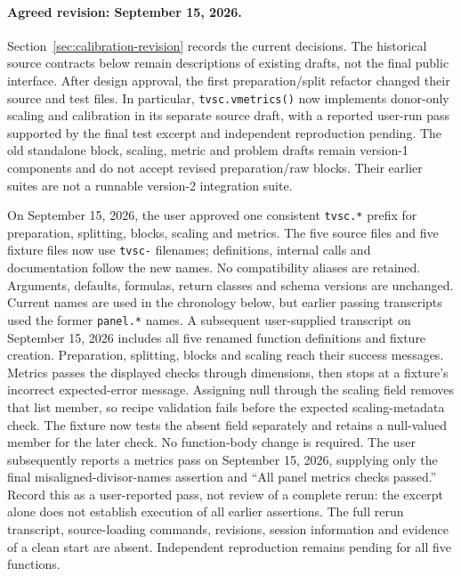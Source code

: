 \documentclass[11pt]{article}
\begin{document}
\paragraph{Agreed revision: September 15, 2026.}
Section~\ref{sec:calibration-revision} records the current decisions.
The historical source contracts below remain descriptions of existing
drafts, not the final public interface. After design approval, the first
preparation/split refactor changed their source and test files. In
particular, \texttt{tvsc.vmetrics()} now implements donor-only scaling and
calibration in its separate source draft, with a reported user-run pass
supported by the final test excerpt and independent reproduction pending.
The old standalone block, scaling, metric and problem drafts remain
version-1 components and do not accept revised preparation/raw blocks.
Their earlier suites are not a runnable version-2 integration suite.

On September 15, 2026, the user approved one consistent \texttt{tvsc.*}
prefix for preparation, splitting, blocks, scaling and metrics. The five
source files and five fixture files now use \texttt{tvsc-} filenames;
definitions, internal calls and documentation follow the new names.
No compatibility aliases are retained. Arguments, defaults, formulas,
return classes and schema versions are unchanged. Current names are used
in the chronology below, but earlier passing transcripts used the former
\texttt{panel.*} names. A subsequent user-supplied transcript on September
15, 2026 includes all five renamed function definitions and fixture
creation. Preparation, splitting, blocks and scaling reach their success
messages. Metrics passes the displayed checks through dimensions, then
stops at a fixture's incorrect expected-error message. Assigning null
through the scaling field removes that list member, so recipe validation
fails before the expected scaling-metadata check. The fixture now tests
the absent field separately and retains a null-valued member for the
later check. No function-body change is required. The user subsequently
reports a metrics pass on September 15, 2026, supplying only the final
misaligned-divisor-names assertion and ``All panel metrics checks passed.''
Record this as a user-reported pass, not review of a complete rerun:
the excerpt alone does not establish execution of all earlier assertions.
The full rerun transcript, source-loading commands, revisions, session information and
evidence of a clean start are absent. Independent reproduction remains
pending for all five functions.
\end{document}
